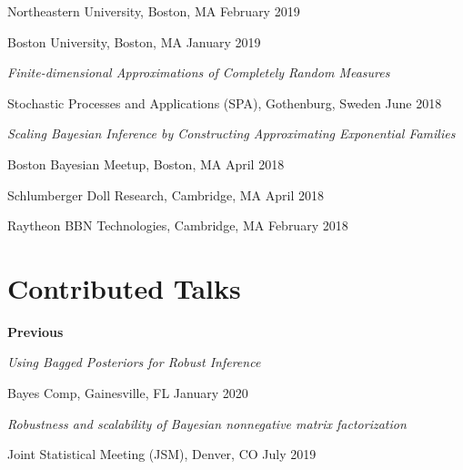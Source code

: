 \documentclass[margin,line]{res}
\newenvironment{talkgroup}{\setlength{\parskip}{3pt}\everypar{\hangafter=1\hangindent=1em\relax}\par}{\par\everypar{\hangafter=0\relax}}
\begin{document}
\begin{resume}
\begin{talkgroup}
Northeastern University, Boston, MA \hfill February 2019

Boston University, Boston, MA \hfill January 2019

\end{talkgroup}

\emph{Finite-dimensional Approximations of Completely Random Measures}

\begin{talkgroup}
Stochastic Processes and Applications (SPA), Gothenburg, Sweden \hfill June 2018

\end{talkgroup}


\emph{Scaling Bayesian Inference by Constructing Approximating Exponential Families}

\begin{talkgroup}
Boston Bayesian Meetup, Boston, MA \hfill April 2018

Schlumberger Doll Research, Cambridge, MA \hfill April 2018

Raytheon BBN Technologies, Cambridge, MA \hfill February 2018

\end{talkgroup}



\section{\sc Contributed Talks}

%
%
%



\textbf{Previous}

\emph{Using Bagged Posteriors for Robust Inference}
\begin{talkgroup}
Bayes Comp, Gainesville, FL \hfill January 2020
\end{talkgroup}

\emph{Robustness and scalability of Bayesian nonnegative matrix factorization}
\begin{talkgroup}
Joint Statistical Meeting (JSM), Denver, CO \hfill July 2019
\end{talkgroup}


\end{resume}
\end{document}
